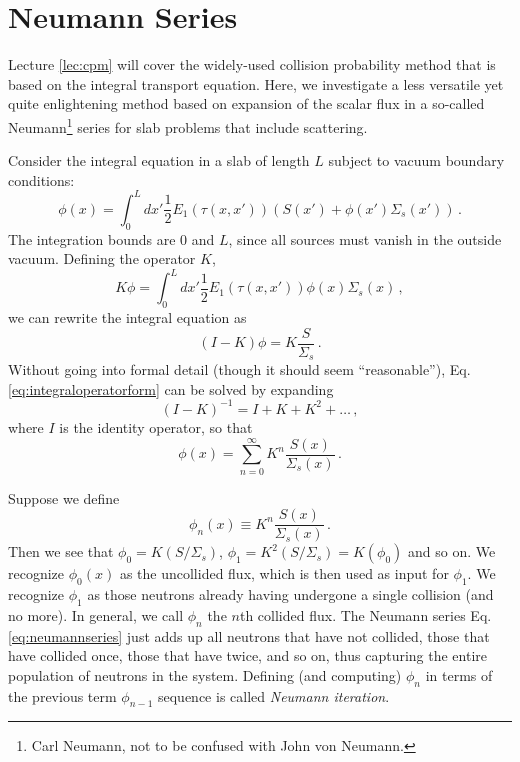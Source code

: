 \section*{Neumann Series}

Lecture \ref{lec:cpm} will cover the widely-used collision probability method that is based on the integral transport equation.  Here, we investigate a less versatile yet quite enlightening method based on expansion of the scalar flux in a so-called Neumann\footnote{Carl Neumann, not to be confused with John von Neumann.} series for slab problems that include scattering.

Consider the integral equation in a slab of length $L$ subject to vacuum boundary conditions:
\begin{equation}
 \phi(x) = \int^L_0  dx' \frac{1}{2} E_1(\tau(x,x'))(S(x') + \phi(x')\Sigma_s(x')) \, .
\end{equation}
The integration bounds are $0$ and $L$, since all sources must vanish in the outside vacuum.  Defining the operator $K$,
\begin{equation}
 K\phi = \int^L_0  dx' \frac{1}{2} E_1(\tau(x,x'))\phi(x) \Sigma_s(x) \, ,
\end{equation}
we can rewrite the integral equation as
\begin{equation}
 (I-K)\phi = K\frac{S}{\Sigma_s} \, .
 \label{eq:integraloperatorform}
\end{equation}
Without going into formal detail (though it should seem ``reasonable''), Eq. \ref{eq:integraloperatorform} can be solved by expanding
\begin{equation}
 (I-K)^{-1} = I + K + K^2 + \ldots \, ,
\end{equation}
where $I$ is the identity operator, so that 
\begin{equation}
 \phi(x) = \sum^{\infty}_{n=0} K^n \frac{S(x)}{\Sigma_s(x)} \, .
 \label{eq:neumannseries}
\end{equation}

Suppose we define
\begin{equation}
 \phi_n(x) \equiv K^n \frac{S(x)}{\Sigma_s(x)} \, .
\end{equation}
Then we see that $\phi_0 = K(S/\Sigma_s)$, $\phi_1 = K^2(S/\Sigma_s) = K(\phi_0)$ and so on.  We recognize $\phi_0(x)$ as the uncollided flux, which is then used as input for $\phi_1$.  We recognize $\phi_1$ as those neutrons already having undergone a single collision (and no more).  In general, we call $\phi_n$ the $n$th collided flux.  The Neumann series Eq. \ref{eq:neumannseries} just adds up all neutrons that have not collided, those that have collided once, those that have twice, and so on, thus capturing the entire population of neutrons in the system.  Defining (and computing)  $\phi_n$ in terms of the previous term $\phi_{n-1}$ sequence is called \textit{Neumann iteration}.

